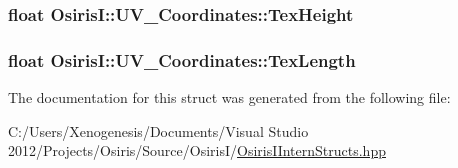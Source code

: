 \hypertarget{struct_osiris_i_1_1_u_v___coordinates_a9a341baaa255aa4ea11adab7a59f16f9}{
\subsubsection[{Tex\-Height}]{\setlength{\rightskip}{0pt plus 5cm}float Osiris\-I\-::\-U\-V\-\_\-\-Coordinates\-::\-Tex\-Height}}\label{struct_osiris_i_1_1_u_v___coordinates_a9a341baaa255aa4ea11adab7a59f16f9}
\hypertarget{struct_osiris_i_1_1_u_v___coordinates_aef136203ffad84348049e97205c88aea}{
\subsubsection[{Tex\-Length}]{\setlength{\rightskip}{0pt plus 5cm}float Osiris\-I\-::\-U\-V\-\_\-\-Coordinates\-::\-Tex\-Length}}\label{struct_osiris_i_1_1_u_v___coordinates_aef136203ffad84348049e97205c88aea}


The documentation for this struct was generated from the following file\-:\begin{DoxyCompactItemize}
\item 
C\-:/\-Users/\-Xenogenesis/\-Documents/\-Visual Studio 2012/\-Projects/\-Osiris/\-Source/\-Osiris\-I/\hyperlink{_osiris_i_intern_structs_8hpp}{Osiris\-I\-Intern\-Structs.\-hpp}\end{DoxyCompactItemize}

